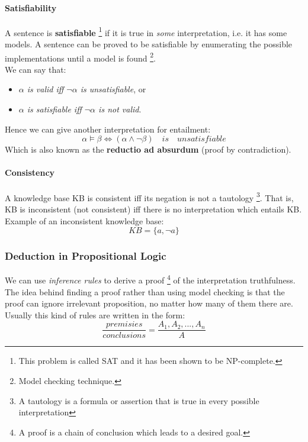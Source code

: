 \documentclass[10pt,a4paper]{article}
\begin{document}
\paragraph{Satisfiability}
\label{sec:satisfiability}
A sentence is \textbf{satisfiable} \footnote{This problem is called SAT and it has been shown to be NP-complete.} if it is true in \textit{some} interpretation, i.e. it has some models. A sentence can be proved to be satisfiable by enumerating the possible implementations until a model is found \footnote{Model checking technique.}.\\
We can say that:
\begin{itemize}
\item \textit{$\alpha$ is valid iff $\neg \alpha$ is unsatisfiable}, or
\item \textit{$\alpha$ is satisfiable iff $\neg \alpha$ is not valid}.
\end{itemize}
Hence we can give another interpretation for entailment:
\[\alpha \models \beta \Longleftrightarrow (\alpha \wedge \neg \beta)\quad is \quad unsatisfiable\]
Which is also known as the \textbf{reductio ad absurdum} (proof by contradiction).


\paragraph{Consistency}
\label{sec:consistency}
A knowledge base KB is consistent iff its negation is not a tautology \footnote{A tautology  is a formula or assertion that is true in every possible interpretation}.
That is, KB is inconsistent (not consistent) iff there is no interpretation which entails KB.\\
Example of an inconsistent knowledge base:
\[KB=\lbrace a, \neg a \rbrace\]


\subsubsection{Deduction in Propositional Logic}
\label{subsubsec:deduction}
We can use \textit{inference rules} to derive a proof \footnote{A proof is a chain of conclusion which leads to a desired goal.} of the interpretation truthfulness.
The idea behind finding a proof rather than using model checking is that the proof can ignore irrelevant proposition, no matter how many of them there are.\\
Usually this kind of rules are written in the form:
\[\frac{premisies}{conclusions}=\frac{A_1,A_2,...,A_n}{A}\]
\end{document}
